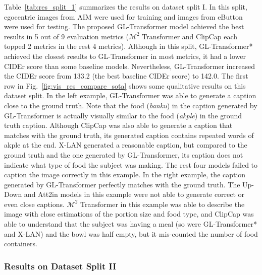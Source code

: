 \documentclass[journal]{IEEEtran}
\begin{document}
Table~\ref{tab:res_split_1} summarizes the results on dataset split I. In this split, egocentric images from AIM were used for training and images from eButton were used for testing. The proposed GL-Transformer model achieved the best results in 5 out of 9 evaluation metrics ($\mathcal{M}^2$ Transformer and ClipCap each topped 2 metrics in the rest 4 metrics). Although in this split, GL-Transformer* achieved the closest results to GL-Transformer in most metrics, it had a lower CIDEr score than some baseline models. Nevertheless, GL-Transformer increased the CIDEr score from 133.2 (the best baseline CIDEr score) to 142.0. The first row in Fig.~\ref{fig:vis_res_compare_sota} shows some qualitative results on this dataset split. In the left example, GL-Transformer was able to generate a caption close to the ground truth. Note that the food (\textit{banku}) in the caption generated by GL-Transformer is actually visually similar to the food (\textit{akple}) in the ground truth caption. Although ClipCap was also able to generate a caption that matches with the ground truth, its generated caption contains repeated words of akple at the end. X-LAN generated a reasonable caption, but compared to the ground truth and the one generated by GL-Transformer, its caption does not indicate what type of food the subject was making. The rest four models failed to caption the image correctly in this example. In the right example, the caption generated by GL-Transformer perfectly matches with the ground truth. The Up-Down and Att2in models in this example were not able to generate correct or even close captions. $\mathcal{M}^2$ Transformer in this example was able to describe the image with close estimations of the portion size and food type, and ClipCap was able to understand that the subject was having a meal (so were GL-Transformer* and X-LAN) and the bowl was half empty, but it mis-counted the number of food containers.











\subsubsection{Results on Dataset Split II}
\end{document}
